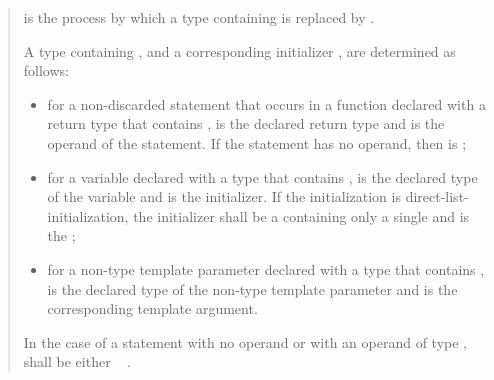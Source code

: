 \begin{quote}
\pnum
{} is the process by which a type containing
  is replaced by
 .

\pnum
A type  containing ,
and a corresponding initializer ,
are determined as follows:

\begin{itemize}
\item
for a non-discarded  statement that occurs
in a function declared with a return type
that contains ,
 is the declared return type
and  is the operand of the  statement.
If the  statement
has no operand,
then  is ;
\item
for a variable declared with a type
that contains ,
 is the declared type of the variable
and  is the initializer.
If the initialization is direct-list-initialization,
the initializer shall be a 
containing only a single 
and  is the ;
\item
for a non-type template parameter declared with a type
that contains ,
 is the declared type of the non-type template parameter
and  is the corresponding template argument.
\end{itemize}
% 
In the case of a  statement with no operand
or with an operand of type ,
 shall be either
 \added{,} \cv{}~%
.



\end{quote}
